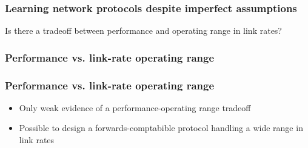 \begin{frame}
\frametitle{Learning network protocols despite imperfect assumptions}
\begin{centering}
Is there a tradeoff between performance and operating range in link rates?
\end{centering}
\end{frame}


\begin{frame}
\frametitle{Performance vs. link-rate operating range}
\begin{centering}

\noindent {}

\end{centering}
\end{frame}

\begin{frame}
\frametitle{Performance vs. link-rate operating range}
\begin{itemize}
\item <2->{Only weak evidence of a performance-operating range tradeoff}
\item <3->{Possible to design a forwards-comptabible protocol handling a wide range in link rates}
\end{itemize}
\end{frame}

